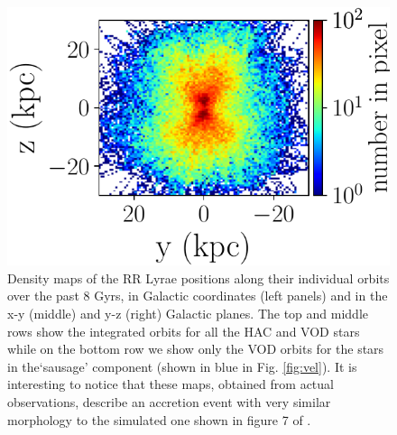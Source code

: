 \documentclass[fleqn,usenatbib]{mnras}
\begin{document}
\begin{figure}
             \includegraphics[scale=0.302]{VOD_orbits_8Gyrs_yz_sausage.pdf}
\vspace{-0.45cm}
   \caption{Density maps of the RR Lyrae positions along their individual orbits over the past 8 Gyrs, in Galactic coordinates (left panels) and in the x-y (middle) and y-z (right) Galactic planes.  The top and middle rows show the integrated orbits for all the HAC and VOD stars while on the bottom row we show only the VOD orbits for the stars in the`sausage' component (shown in blue in Fig. \ref{fig:vel}). It is interesting to notice that these maps, obtained from actual observations, describe an accretion event with very similar morphology to the simulated one shown in figure 7 of \citet{Simion2018}.}
    \label{fig:backorbits}
\end{figure}
%
%
\end{document}

